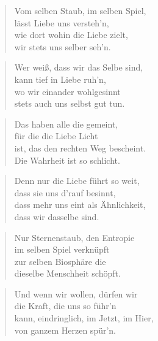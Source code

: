 \documentclass[10pt,a4paper]{article}
\begin{document}
\begin{multicols}{2}
\begin{verse}
Vom selben Staub, im selben Spiel, \\
lässt Liebe uns versteh’n, \\
wie dort wohin die Liebe zielt, \\
wir stets uns selber seh’n. \\
\end{verse}

\begin{verse}
Wer weiß, dass wir das Selbe sind, \\
kann tief in Liebe ruh’n, \\
wo wir einander wohlgesinnt \\
stets auch uns selbst gut tun. \\
\end{verse}

\begin{verse}
Das haben alle die gemeint, \\
für die die Liebe Licht \\
ist, das den rechten Weg bescheint. \\
Die Wahrheit ist so schlicht. \\
\end{verse}

\begin{verse}
Denn nur die Liebe führt so weit, \\
dass sie uns d’rauf besinnt, \\
dass mehr uns eint als Ähnlichkeit, \\
dass wir dasselbe sind. \\
\end{verse}

\begin{verse}
Nur Sternenstaub, den Entropie \\
im selben Spiel verknüpft \\
zur selben Biosphäre die \\
dieselbe Menschheit schöpft. \\
\end{verse}

\begin{verse}
Und wenn wir wollen, dürfen wir \\
die Kraft, die uns so führ’n \\
kann, eindringlich, im Jetzt, im Hier, \\
von ganzem Herzen spür’n. \\
\end{verse}


\end{multicols}
\end{document}
